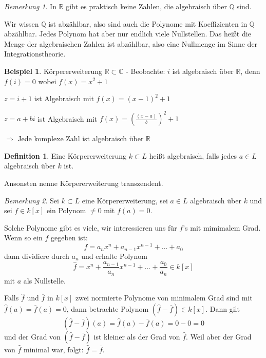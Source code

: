 \documentclass[12pt,parskip=full]{scrartcl}
\newcommand{\setQ}{\mathbb{Q}}
\newcommand{\setR}{\mathbb{R}}
\newcommand{\setC}{\mathbb{C}}
\theoremstyle{definition}
\newtheorem{definition}[theorem]{Definition}
\newtheorem{example}[theorem]{Beispiel}
\theoremstyle{remark}
\newtheorem*{remark}{Bemerkung}
\begin{document}
	\begin{remark}
		In $\setR$ gibt es praktisch keine Zahlen, die algebraisch über $\setQ$ sind.
		
		Wir wissen $\setQ$ ist abzählbar, also sind auch die Polynome mit Koeffizienten in $\setQ$ abzählbar. Jedes Polynom hat aber nur endlich viele Nullstellen. Das heißt die Menge der algebraischen Zahlen ist abzählbar, also eine Nullmenge im Sinne der Integrationstheorie.
	\end{remark}

	\begin{example}
		Körpererweiterung $\setR \subset \setC$ - Beobachte: $i$ ist algebraisch über $\setR$, denn $f(i) = 0$ wobei $f(x) = x^2 + 1$
		
		$z = i + 1$ ist Algebraisch mit $f(x) = (x - 1)^2 + 1$
		
		$z = a + bi$ ist Algebraisch mit $f(x) = \left( \frac{(x - a)}{b} \right)^2 + 1$
		
		$\Rightarrow$ Jede komplexe Zahl ist algebraisch über $\setR$
	\end{example}

	\begin{definition}
		Eine Körpererweiterung $k \subset L$ heißt algebraisch, falls jedes $a \in L$ algebraisch über $k$ ist.
		
		Ansonsten nenne Körpererweiterung transzendent.
	\end{definition}

	\begin{remark}
		Sei $k \subset L$ eine Körpererweiterung, sei $a \in L$ algebraisch über $k$ und sei $f \in k[x]$ ein Polynom $\neq 0$ mit $f(a) = 0$.
		
		Solche Polynome gibt es viele, wir interessieren uns für $f$'s mit mimimalem Grad. Wenn so ein $f$ gegeben ist:
		\begin{equation*}
			f = a_n x^n + a_{n-1} x^{n-1} + \dots + a_0
		\end{equation*}
		dann dividiere durch $a_n$ und erhalte Polynom
		\begin{equation*}
			\hat{f} = x^n + \frac{a_{n-1}}{a_n} x^{n-1} + \dots + \frac{a_0}{a_n} \in k[x]
		\end{equation*}
		mit $a$ als Nullstelle.
		
		Falls $\hat{f}$ und $\overline{f}$ in $k[x]$ zwei normierte Polynome von minimalem Grad sind mit $\hat{f}(a) = \overline{f}(a) = 0$, dann betrachte Polynom $(\hat{f} - \overline{f}) \in k[x]$. Dann gilt
		\begin{equation*}
			(\hat{f} - \overline{f})(a) = \hat{f}(a) - \overline{f}(a) = 0 - 0 = 0
		\end{equation*}
		und der Grad von $(\hat{f} - \overline{f})$ ist kleiner als der Grad von $\hat{f}$. Weil aber der Grad von $\hat{f}$ minimal war, folgt: $\hat{f} = \overline{f}$.
	\end{remark}
\end{document}
